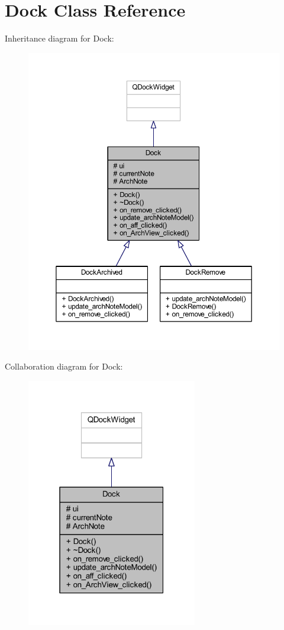 \hypertarget{class_dock}{}\section{Dock Class Reference}
\label{class_dock}


Inheritance diagram for Dock\+:\nopagebreak
\begin{figure}[H]
\begin{center}
\leavevmode
\includegraphics[width=350pt]{class_dock__inherit__graph}
\end{center}
\end{figure}


Collaboration diagram for Dock\+:\nopagebreak
\begin{figure}[H]
\begin{center}
\leavevmode
\includegraphics[width=211pt]{class_dock__coll__graph}
\end{center}
\end{figure}
